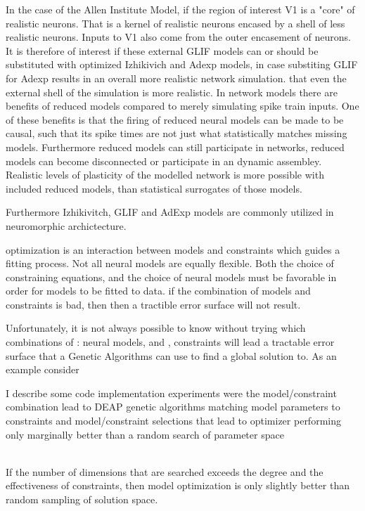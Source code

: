 
In the case of the Allen Institute Model, if the region of interest V1 is a "core" of realistic neurons. That is a kernel of realistic neurons encased by a shell of less realistic neurons. Inputs to V1 also come from the outer encasement of neurons. It is therefore of interest if these external GLIF models can or should be substituted with optimized Izhikivich and Adexp models, in case substiting GLIF for Adexp results in an overall more realistic network simulation. that even the external shell of the simulation is more realistic. In network models there are benefits of reduced models compared to merely simulating spike train inputs. One of these benefits is that the firing of reduced neural models can be made to be causal, such that its spike times are not just what statistically matches missing models. Furthermore reduced models can still participate in networks, reduced models can become disconnected or participate in an dynamic assembley. Realistic levels of plasticity of the modelled network is more possible with included reduced models, than statistical surrogates of those models.

Furthermore Izhikivitch, GLIF and AdExp models are commonly utilized in neuromorphic archictecture.

optimization is an interaction between models and constraints which guides a fitting process. Not all neural models are equally flexible.  
Both the choice of constraining equations, and the choice of neural models must be favorable in order for models to be fitted to data.
if the combination of models and constraints is bad, then then a tractible error surface will not result.  

Unfortunately, it is not always possible to know without trying which combinations of \subitem[A]: neural models, and \subitem[B], constraints will lead a tractable error surface that a Genetic Algorithms can use to find a global solution to. As an example consider  

I describe some code implementation experiments were the model/constraint combination lead to DEAP genetic algorithms matching model parameters to constraints and model/constraint selections that lead to optimizer performing only marginally better than a random search of parameter space\\
\\
\item If the number of dimensions that are searched exceeds the degree and the effectiveness of constraints, then model optimization is only slightly better than random sampling of solution space.

